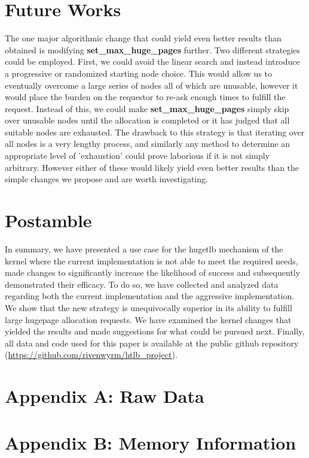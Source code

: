 \documentclass{article}
\begin{document}
\section{Future Works}
The one major algorithmic change that could yield even better results than obtained is modifying \textbf{set\_max\_huge\_pages} further. Two different strategies could be employed. First, we could avoid the linear search and instead introduce a progressive or randomized starting node choice. This would allow us to eventually overcome a large series of nodes all of which are unusable, however it would place the burden on the requestor to re-ask enough times to fulfill the request. Instead of this, we could make \textbf{set\_max\_huge\_pages} simply skip over unusable nodes until the allocation is completed or it has judged that all suitable nodes are exhausted. The drawback to this strategy is that iterating over all nodes is a very lengthy process, and similarly any method to determine an appropriate level of 'exhaustion' could prove laborious if it is not simply arbitrary. However either of these would likely yield even better results than the simple changes we propose and are worth investigating.

\section{Postamble}
In summary, we have presented a use case for the hugetlb mechanism of the kernel where the current implementation is not able to meet the required needs, made changes to significantly increase the likelihood of success and subsequently demonstrated their efficacy. To do so, we have collected and analyzed data regarding both the current implementation and the aggressive implementation. We show that the new strategy is unequivocally superior in its ability to fulfill large hugepage allocation requests. We have examined the kernel changes that yielded the results and made suggestions for what could be pursued next. Finally, all data and code used for this paper is available at the public github repository (\url{https://github.com/rivenwyrm/htlb_project}).

\begin{appendices}
	\newpage
	\section{Appendix A: Raw Data}
		
		\label{figure:Raw Hugepage Test Scenario Data}
	\section{Appendix B: Memory Information} 
		
		\label{figure:System Memory Information At Startup}
\end{appendices}
\end{document}
